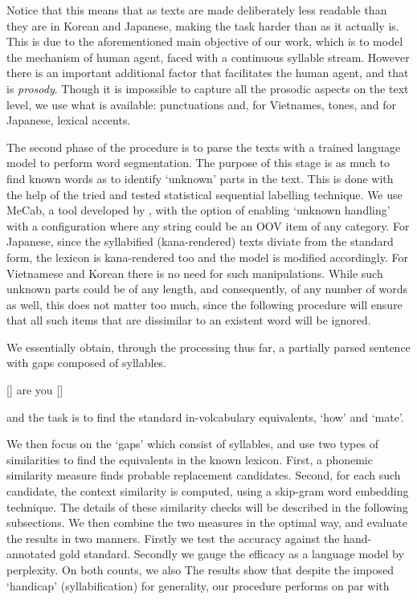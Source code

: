 \documentclass[11pt]{article}
\begin{document}
Notice that this means that as texts are made deliberately less readable than they are in Korean and Japanese, making the task harder than as it actually is. This is due to the aforementioned main objective of our work, which is to model the mechanism of human agent, faced with a continuous syllable stream. However there is an important additional factor that facilitates the human agent, and that is \emph{prosody}. Though it is impossible to capture all the prosodic aspects on the text level, we use what is available: punctuations and, for Vietnames, tones, and for Japanese, lexical accents.   

The second phase of the procedure is to parse the texts with a trained language model to perform word segmentation. The purpose of this stage is as much to find known words as to identify `unknown' parts in the text. This is done with the help of the tried and tested statistical sequential labelling technique. We use MeCab, a tool developed by \cite{KudoEtAl04}, with the option of enabling `unknown handling' with a configuration where any string could be an OOV item of any category. For Japanese, since the syllabified (kana-rendered) texts diviate from the standard form, the lexicon is kana-rendered too and the model is modified accordingly. For Vietnamese and Korean there is no need for such manipulations. While such unknown parts could be of any length, and consequently, of any number of words as well, this does not matter too much, since the following procedure will ensure that all such items that are dissimilar to an existent word will be ignored. 

We essentially obtain, through the processing thus far, a partially parsed sentence with gaps composed of syllables. 

[] are you [\textipa{}]

\noindent and the task is to find the standard in-volcabulary equivalents, `how' and `mate'.


We then focus on the `gaps' which consist of syllables, and use two types of similarities to find the equivalents in the known lexicon. First, a phonemic similarity measure finds probable replacement candidates. Second, for each such candidate, the context similarity is computed, using a skip-gram word embedding technique. The details of these similarity checks will be described in the following subsections. We then combine the two measures in the optimal way, and evaluate the results in two manners. Firstly we test the accuracy against the hand-annotated gold standard. Secondly we gauge the efficacy as a language model by perplexity. On both counts, we also The results show that despite the imposed `handicap' (syllabification) for generality, our procedure performs on par with 
\end{document}
